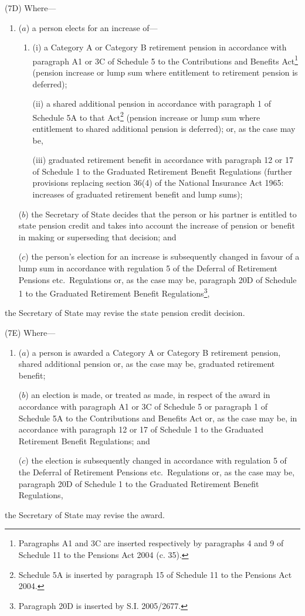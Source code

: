 \documentclass[12pt,a4paper]{article}
\begin{document}
(7D) Where—
\begin{enumerate}\item[]
($a$) a person elects for an increase of—
\begin{enumerate}\item[]
(i) a Category A or Category B retirement pension in accordance with paragraph A1 or 3C of Schedule 5 to the Contributions and Benefits Act\footnote{Paragraphs A1 and 3C are inserted respectively by paragraphs 4 and 9 of Schedule 11 to the Pensions Act 2004 (c. 35).} (pension increase or lump sum where entitlement to retirement pension is deferred);

(ii) a shared additional pension in accordance with paragraph 1 of Schedule 5A to that Act\footnote{Schedule 5A is inserted by paragraph 15 of Schedule 11 to the Pensions Act 2004.} (pension increase or lump sum where entitlement to shared additional pension is deferred); or, as the case may be,

(iii) graduated retirement benefit in accordance with paragraph 12 or 17 of Schedule 1 to the Graduated Retirement Benefit Regulations (further provisions replacing section 36(4) of the National Insurance Act 1965: increases of graduated retirement benefit and lump sums);\end{enumerate}

($b$) the Secretary of State decides that the person or his partner is entitled to state pension credit and takes into account the increase of pension or benefit in making or superseding that decision; and

($c$) the person’s election for an increase is subsequently changed in favour of a lump sum in accordance with regulation 5 of the Deferral of Retirement Pensions etc.\ Regulations or, as the case may be, paragraph 20D of Schedule 1 to the Graduated Retirement Benefit Regulations\footnote{Paragraph 20D is inserted by S.I. 2005/2677.},
\end{enumerate}
the Secretary of State may revise the state pension credit decision.

(7E) Where—
\begin{enumerate}\item[]
($a$) a person is awarded a Category A or Category B retirement pension, shared additional pension or, as the case may be, graduated retirement benefit;

($b$) an election is made, or treated as made, in respect of the award in accordance with paragraph A1 or 3C of Schedule 5 or paragraph 1 of Schedule 5A to the Contributions and Benefits Act or, as the case may be, in accordance with paragraph 12 or 17 of Schedule 1 to the Graduated Retirement Benefit Regulations; and

($c$) the election is subsequently changed in accordance with regulation 5 of the Deferral of Retirement Pensions etc.\ Regulations or, as the case may be, paragraph 20D of Schedule 1 to the Graduated Retirement Benefit Regulations,
\end{enumerate}
the Secretary of State may revise the award.
\end{document}
